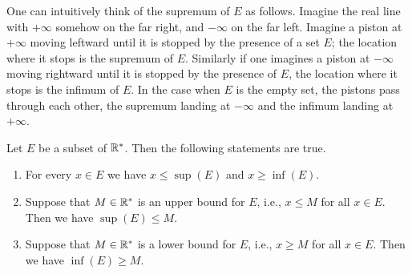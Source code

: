 \begin{note}
  One can intuitively think of the supremum of \(E\) as follows.
  Imagine the real line with \(+\infty\) somehow on the far right, and \(-\infty\) on the far left.
  Imagine a piston at \(+\infty\) moving leftward until it is stopped by the presence of a set \(E\);
  the location where it stops is the supremum of \(E\).
  Similarly if one imagines a piston at \(-\infty\) moving rightward until it is stopped by the presence of \(E\), the location where it stops is the infimum of \(E\).
  In the case when \(E\) is the empty set, the pistons pass through each other, the supremum landing at \(-\infty\) and the infimum landing at \(+\infty\).
\end{note}

\begin{thm}\label{i:6.2.11}
  Let \(E\) be a subset of \(\mathbb{R}^*\).
  Then the following statements are true.
  \begin{enumerate}
    \item For every \(x \in E\) we have \(x \leq \sup(E)\) and \(x \geq \inf(E)\).
    \item Suppose that \(M \in \mathbb{R}^*\) is an upper bound for \(E\), i.e., \(x \leq M\) for all \(x \in E\).
          Then we have \(\sup(E) \leq M\).
    \item Suppose that \(M \in \mathbb{R}^*\) is a lower bound for \(E\), i.e., \(x \geq M\) for all \(x \in E\).
          Then we have \(\inf(E) \geq M\).
  \end{enumerate}
\end{thm}

